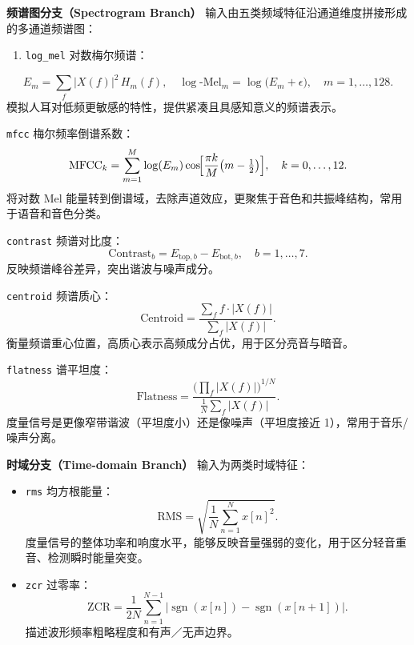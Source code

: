 \documentclass[a4paper,12pt]{article}
\begin{document}
\textbf{频谱图分支（Spectrogram Branch）}  
    输入由五类频域特征沿通道维度拼接形成的多通道频谱图：
    \begin{enumerate}
        \item \texttt{log\_mel} 对数梅尔频谱：
    \end{enumerate}
        \begin{equation}
            E_m = \sum_{f} |X(f)|^2\, H_m(f), \quad
            \log\text{-Mel}_m = \log\bigl(E_m + \epsilon\bigr),\quad m=1,\dots,128.
        \end{equation}
        模拟人耳对低频更敏感的特性，提供紧凑且具感知意义的频谱表示。
        
    \texttt{mfcc} 梅尔频率倒谱系数：
        \begin{equation}
            \mathrm{MFCC}_k = \sum_{m=1}^{M} \log(E_m)\cos\!\Bigl[\frac{\pi k}{M}\bigl(m - \tfrac{1}{2}\bigr)\Bigr],\quad k=0,\dots,12.
        \end{equation}
        将对数 Mel 能量转到倒谱域，去除声道效应，更聚焦于音色和共振峰结构，常用于语音和音色分类。
        
    \texttt{contrast} 频谱对比度：
        \begin{equation}
            \mathrm{Contrast}_b = E_{\mathrm{top},b} - E_{\mathrm{bot},b},\quad b=1,\dots,7.
        \end{equation}
        反映频谱峰谷差异，突出谐波与噪声成分。
        
    \texttt{centroid} 频谱质心：
        \begin{equation}
            \mathrm{Centroid} = \frac{\sum_f f\cdot |X(f)|}{\sum_f |X(f)|}.
        \end{equation}
        衡量频谱重心位置，高质心表示高频成分占优，用于区分亮音与暗音。
        
    \texttt{flatness} 谱平坦度：
        \begin{equation}
            \mathrm{Flatness} = \frac{\bigl(\prod_f |X(f)|\bigr)^{1/N}}{\frac{1}{N}\sum_f |X(f)|}.
        \end{equation}
        度量信号是更像窄带谐波（平坦度小）还是像噪声（平坦度接近 1），常用于音乐/噪声分离。
    
\textbf{时域分支（Time-domain Branch）}  
    输入为两类时域特征：
    \begin{itemize}
        \item \texttt{rms} 均方根能量：
        \begin{equation}
            \mathrm{RMS} = \sqrt{\frac{1}{N}\sum_{n=1}^N x[n]^2}.
        \end{equation}
        度量信号的整体功率和响度水平，能够反映音量强弱的变化，用于区分轻音重音、检测瞬时能量突变。
        
        \item \texttt{zcr} 过零率：
        \begin{equation}
            \mathrm{ZCR} = \frac{1}{2N} \sum_{n=1}^{N-1} \bigl|\operatorname{sgn}(x[n]) - \operatorname{sgn}(x[n+1])\bigr|.
        \end{equation}
        描述波形频率粗略程度和有声／无声边界。
    \end{itemize}
    
\end{document}
